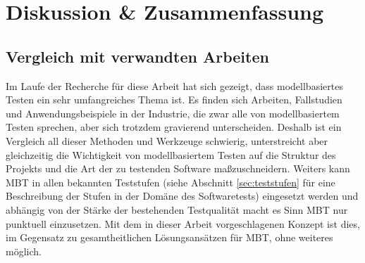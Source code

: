 \makeatletter\ifthesis@masterthesis
\chapter{Diskussion \& Zusammenfassung}
\label{sec:discussion}

\section{Vergleich mit verwandten Arbeiten}
Im Laufe der Recherche für diese Arbeit hat sich gezeigt, dass modellbasiertes Testen ein sehr umfangreiches Thema ist. Es finden sich Arbeiten, Fallstudien und Anwendungsbeispiele in der Industrie, die zwar alle von modellbasiertem Testen sprechen, aber sich trotzdem gravierend unterscheiden. Deshalb ist ein Vergleich all dieser Methoden und Werkzeuge schwierig, unterstreicht aber gleichzeitig die Wichtigkeit von modellbasiertem Testen auf die Struktur des Projekts und die Art der zu testenden Software maßzuschneidern. Weiters kann \Gls{MBT} in allen bekannten Teststufen (siehe Abschnitt \ref{sec:teststufen} für eine Beschreibung der Stufen in der Domäne des Softwaretests) eingesetzt werden und abhängig von der Stärke der bestehenden Testqualität macht es Sinn \Gls{MBT} nur punktuell einzusetzen. Mit dem in dieser Arbeit vorgeschlagenen Konzept ist dies, im Gegensatz zu gesamtheitlichen Lösungsansätzen für \Gls{MBT}, ohne weiteres möglich.\\
